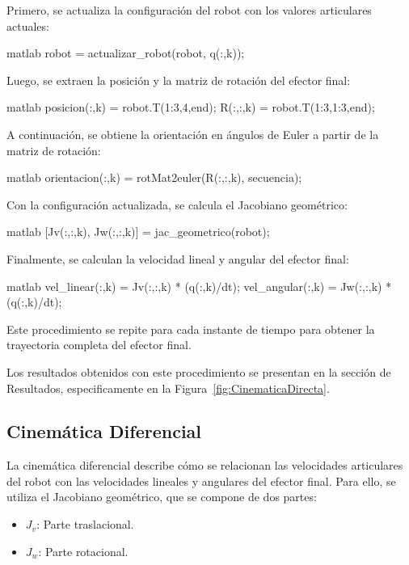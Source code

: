 Primero, se actualiza la configuración del robot con los valores articulares actuales:

\begin{matlabcode}{matlab}
	robot = actualizar_robot(robot, q(:,k));
\end{matlabcode}

Luego, se extraen la posición y la matriz de rotación del efector final:

\begin{matlabcode}{matlab}
	posicion(:,k) = robot.T(1:3,4,end);
	R(:,:,k) = robot.T(1:3,1:3,end);
\end{matlabcode}

A continuación, se obtiene la orientación en ángulos de Euler a partir de la matriz de rotación:

\begin{matlabcode}{matlab}
	orientacion(:,k) = rotMat2euler(R(:,:,k), secuencia);
\end{matlabcode}

Con la configuración actualizada, se calcula el Jacobiano geométrico:

\begin{matlabcode}{matlab}
	[Jv(:,:,k), Jw(:,:,k)] = jac_geometrico(robot);
\end{matlabcode}

Finalmente, se calculan la velocidad lineal y angular del efector final:

\begin{matlabcode}{matlab}
	vel_linear(:,k)  = Jv(:,:,k) * (q(:,k)/dt);
	vel_angular(:,k) = Jw(:,:,k) * (q(:,k)/dt);
\end{matlabcode}

Este procedimiento se repite para cada instante de tiempo para obtener la trayectoria completa del efector final.

Los resultados obtenidos con este procedimiento se presentan en la sección de Resultados, especificamente en la Figura~\ref{fig:CinematicaDirecta}.

\subsection{Cinemática Diferencial}

La cinemática diferencial describe cómo se relacionan las velocidades articulares del robot con las velocidades lineales y angulares del efector final. Para ello, se utiliza el Jacobiano geométrico, que se compone de dos partes:
\begin{itemize}
	\item $J_v$: Parte traslacional.
	\item $J_w$: Parte rotacional.
\end{itemize}

